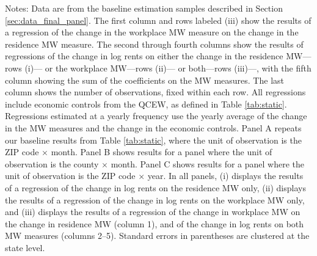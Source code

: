 \begin{landscape}
\begin{table}[ht!]
    \begin{minipage}{.95\linewidth} \footnotesize
        \vspace{2mm}
        Notes:
        Data are from the baseline estimation samples described in Section 
        \ref{sec:data_final_panel}.
        The first column and rows labeled (iii) show the results of a regression 
        of the change in the workplace MW measure on the change in the 
        residence MW measure.
        The second through fourth columns show the results of regressions of the 
        change in log rents on either the change in the residence MW---rows (i)---
        or the workplace MW---rows (ii)--- 
        or both---rows (iii)---, with the fifth column showing the sum of the 
        coefficients on the MW measures.
        The last column shows the number of observations, fixed within each row.
        All regressions include economic controls from the QCEW, as defined in
        Table \ref{tab:static}.
        Regressions estimated at a yearly frequency use the yearly average of
        the change in the MW measures and the change in the economic controls.
        Panel A repeats our baseline results from Table \ref{tab:static}, where 
        the unit of observation is the ZIP code $\times$ month.
        Panel B shows results for a panel where the unit of observation is the 
        county $\times$ month.
        Panel C shows results for a panel where the unit of observation is the 
        ZIP code $\times$ year.
        In all panels,
        (i) displays the results of a regression of the change in log rents on 
        the residence MW only,
        (ii) displays the results of a regression of the change in log 
        rents on the workplace MW only, and
        (iii) displays the results of a regression of the change in workplace
        MW on the change in residence MW (column 1), and of the change in 
        log rents on both MW measures (columns 2--5).
        Standard errors in parentheses are clustered at the state level.
    \end{minipage}
\end{table}
\end{landscape}
